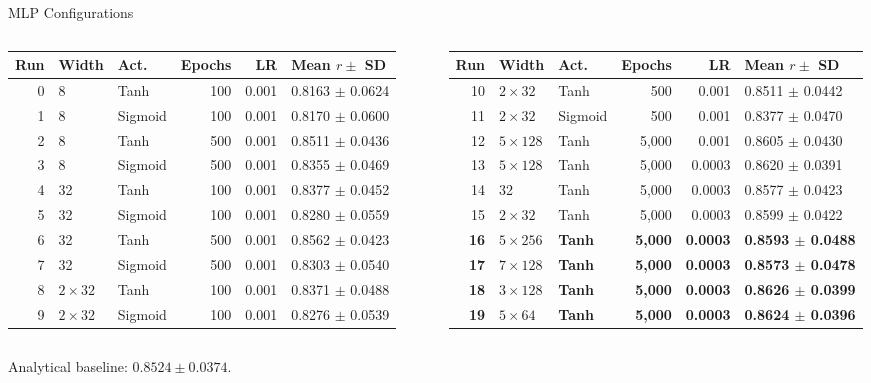 \documentclass[aspectratio=169,11pt]{beamer}
\begin{document}
\begin{frame}[t]{MLP Configurations}
\vspace{0.15cm}\begin{columns}[T,onlytextwidth]\centering\scriptsize\setlength{\tabcolsep}{2.2pt}
\begin{tabular}{rllrrl}\toprule
Run & Width & Act. & Epochs & LR & Mean $r\pm$ SD\\\midrule
0 & 8 & Tanh & 100 & 0.001 & 0.8163 $\pm$ 0.0624\\
1 & 8 & Sigmoid & 100 & 0.001 & 0.8170 $\pm$ 0.0600\\
2 & 8 & Tanh & 500 & 0.001 & 0.8511 $\pm$ 0.0436\\
3 & 8 & Sigmoid & 500 & 0.001 & 0.8355 $\pm$ 0.0469\\
4 & 32 & Tanh & 100 & 0.001 & 0.8377 $\pm$ 0.0452\\
5 & 32 & Sigmoid & 100 & 0.001 & 0.8280 $\pm$ 0.0559\\
6 & 32 & Tanh & 500 & 0.001 & 0.8562 $\pm$ 0.0423\\
7 & 32 & Sigmoid & 500 & 0.001 & 0.8303 $\pm$ 0.0540\\
8 & $2\times32$ & Tanh & 100 & 0.001 & 0.8371 $\pm$ 0.0488\\
9 & $2\times32$ & Sigmoid & 100 & 0.001 & 0.8276 $\pm$ 0.0539\\\bottomrule\end{tabular}\centering\scriptsize\setlength{\tabcolsep}{2.2pt}
\begin{tabular}{rllrrl}\toprule
Run & Width & Act. & Epochs & LR & Mean $r\pm$ SD\\\midrule
10 & $2\times32$ & Tanh & 500 & 0.001 & 0.8511 $\pm$ 0.0442\\
11 & $2\times32$ & Sigmoid & 500 & 0.001 & 0.8377 $\pm$ 0.0470\\
12 & $5\times128$ & Tanh & 5,000 & 0.001 & 0.8605 $\pm$ 0.0430\\
13 & $5\times128$ & Tanh & 5,000 & 0.0003 & 0.8620 $\pm$ 0.0391\\
14 & 32 & Tanh & 5,000 & 0.0003 & 0.8577 $\pm$ 0.0423\\
15 & $2\times32$ & Tanh & 5,000 & 0.0003 & 0.8599 $\pm$ 0.0422\\
\textbf{16} & \textbf{$5\times256$} & \textbf{Tanh} & \textbf{5,000} & \textbf{0.0003} & \textbf{0.8593 $\pm$ 0.0488}\\
\textbf{17} & \textbf{$7\times128$} & \textbf{Tanh} & \textbf{5,000} & \textbf{0.0003} & \textbf{0.8573 $\pm$ 0.0478}\\
\textbf{18} & \textbf{$3\times128$} & \textbf{Tanh} & \textbf{5,000} & \textbf{0.0003} & \textbf{0.8626 $\pm$ 0.0399}\\
\textbf{19} & \textbf{$5\times64$} & \textbf{Tanh} & \textbf{5,000} & \textbf{0.0003} & \textbf{0.8624 $\pm$ 0.0396}\\\bottomrule\end{tabular}\end{columns}\vspace{0.35cm}\small Analytical baseline: $0.8524\pm0.0374$.
\end{frame}
\end{document}

